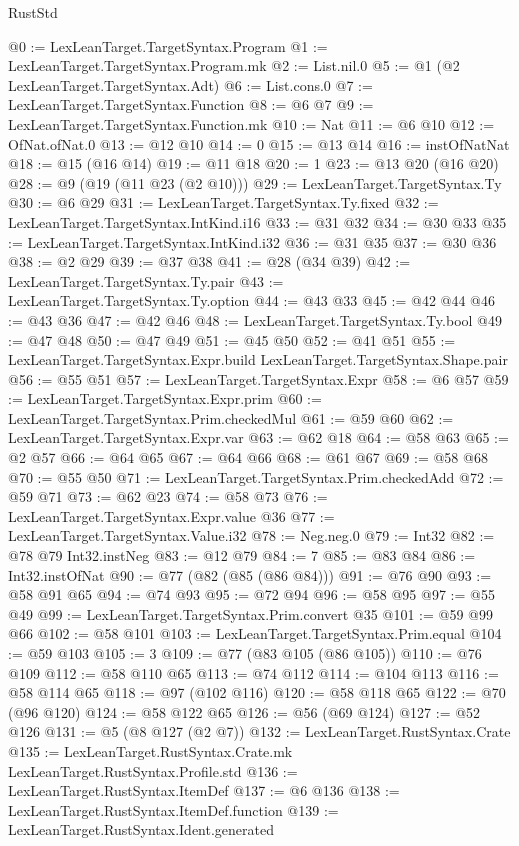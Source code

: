 \begin{lexlean}{RustStd}
\begin{coremodule}
@0 := LexLeanTarget.TargetSyntax.Program
@1 := LexLeanTarget.TargetSyntax.Program.mk
@2 := List.nil.{0}
@5 := @1 (@2 LexLeanTarget.TargetSyntax.Adt)
@6 := List.cons.{0}
@7 := LexLeanTarget.TargetSyntax.Function
@8 := @6 @7
@9 := LexLeanTarget.TargetSyntax.Function.mk
@10 := Nat
@11 := @6 @10
@12 := OfNat.ofNat.{0}
@13 := @12 @10
@14 := 0
@15 := @13 @14
@16 := instOfNatNat
@18 := @15 (@16 @14)
@19 := @11 @18
@20 := 1
@23 := @13 @20 (@16 @20)
@28 := @9 (@19 (@11 @23 (@2 @10)))
@29 := LexLeanTarget.TargetSyntax.Ty
@30 := @6 @29
@31 := LexLeanTarget.TargetSyntax.Ty.fixed
@32 := LexLeanTarget.TargetSyntax.IntKind.i16
@33 := @31 @32
@34 := @30 @33
@35 := LexLeanTarget.TargetSyntax.IntKind.i32
@36 := @31 @35
@37 := @30 @36
@38 := @2 @29
@39 := @37 @38
@41 := @28 (@34 @39)
@42 := LexLeanTarget.TargetSyntax.Ty.pair
@43 := LexLeanTarget.TargetSyntax.Ty.option
@44 := @43 @33
@45 := @42 @44
@46 := @43 @36
@47 := @42 @46
@48 := LexLeanTarget.TargetSyntax.Ty.bool
@49 := @47 @48
@50 := @47 @49
@51 := @45 @50
@52 := @41 @51
@55 := LexLeanTarget.TargetSyntax.Expr.build LexLeanTarget.TargetSyntax.Shape.pair
@56 := @55 @51
@57 := LexLeanTarget.TargetSyntax.Expr
@58 := @6 @57
@59 := LexLeanTarget.TargetSyntax.Expr.prim
@60 := LexLeanTarget.TargetSyntax.Prim.checkedMul
@61 := @59 @60
@62 := LexLeanTarget.TargetSyntax.Expr.var
@63 := @62 @18
@64 := @58 @63
@65 := @2 @57
@66 := @64 @65
@67 := @64 @66
@68 := @61 @67
@69 := @58 @68
@70 := @55 @50
@71 := LexLeanTarget.TargetSyntax.Prim.checkedAdd
@72 := @59 @71
@73 := @62 @23
@74 := @58 @73
@76 := LexLeanTarget.TargetSyntax.Expr.value @36
@77 := LexLeanTarget.TargetSyntax.Value.i32
@78 := Neg.neg.{0}
@79 := Int32
@82 := @78 @79 Int32.instNeg
@83 := @12 @79
@84 := 7
@85 := @83 @84
@86 := Int32.instOfNat
@90 := @77 (@82 (@85 (@86 @84)))
@91 := @76 @90
@93 := @58 @91 @65
@94 := @74 @93
@95 := @72 @94
@96 := @58 @95
@97 := @55 @49
@99 := LexLeanTarget.TargetSyntax.Prim.convert @35
@101 := @59 @99 @66
@102 := @58 @101
@103 := LexLeanTarget.TargetSyntax.Prim.equal
@104 := @59 @103
@105 := 3
@109 := @77 (@83 @105 (@86 @105))
@110 := @76 @109
@112 := @58 @110 @65
@113 := @74 @112
@114 := @104 @113
@116 := @58 @114 @65
@118 := @97 (@102 @116)
@120 := @58 @118 @65
@122 := @70 (@96 @120)
@124 := @58 @122 @65
@126 := @56 (@69 @124)
@127 := @52 @126
@131 := @5 (@8 @127 (@2 @7))
@132 := LexLeanTarget.RustSyntax.Crate
@135 := LexLeanTarget.RustSyntax.Crate.mk LexLeanTarget.RustSyntax.Profile.std
@136 := LexLeanTarget.RustSyntax.ItemDef
@137 := @6 @136
@138 := LexLeanTarget.RustSyntax.ItemDef.function
@139 := LexLeanTarget.RustSyntax.Ident.generated

\end{coremodule}
\end{lexlean}
